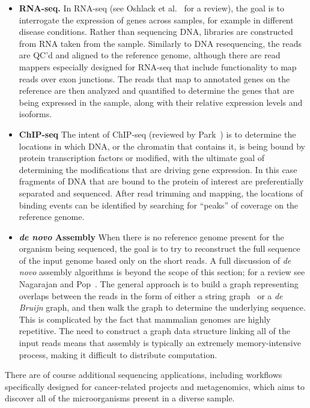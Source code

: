 \begin{itemize}
\item \textbf{RNA-seq.} In RNA-seq (see Oshlack et al.~\cite{Oshlack:2010kr} for a review), the goal is to interrogate the expression of genes across samples, for example in different disease conditions. Rather than sequencing DNA, libraries are constructed from RNA taken from the sample. Similarly to DNA resequencing, the reads are QC'd and aligned to the reference genome, although there are read mappers especially designed for RNA-seq that include functionality to map reads over exon junctions. The reads that map to annotated genes on the reference are then analyzed and quantified to determine  the genes that are being expressed in the sample, along with their relative expression levels and isoforms.

\item \textbf{ChIP-seq} The intent of ChIP-seq (reviewed by Park~\cite{Park:2009gl}) is to determine the locations in which DNA, or the chromatin that contains it, is being bound by protein transcription factors or modified, with the ultimate goal of determining the modifications that are driving gene expression. In this case fragments of DNA that are bound to the protein of interest are preferentially separated and sequenced. After read trimming and mapping, the locations of binding events can be identified by searching for ``peaks'' of coverage on the reference genome.

\item \textbf{\emph{de novo} Assembly} When there is no reference genome present for the organism being sequenced, the goal is to try to reconstruct the full sequence of the input genome based only on the short reads. A full discussion of \emph{de novo} assembly algorithms is beyond the scope of this section; for a review see Nagarajan and Pop~\cite{Nagarajan:2013cq}. The general approach is to build a graph representing overlaps between the reads in the form of either a string graph~\cite{Myers:2005iq} or a \emph{de Bruijn} graph, and then walk the graph to determine the underlying sequence. This is complicated by the fact that mammalian genomes are highly repetitive. The need to construct a graph data structure linking all of the input reads means that assembly is typically an extremely memory-intensive process, making it difficult to distribute computation.

\end{itemize}

There are of course additional sequencing applications, including workflows specifically designed for cancer-related projects and metagenomics, which aims to discover all of the microorganisms present in a diverse sample. 

